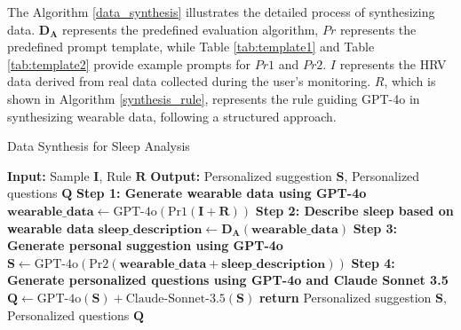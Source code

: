 \documentclass[preprint,12pt]{elsarticle}
\begin{document}
The Algorithm \ref{data_synthesis} illustrates the detailed process of synthesizing data. $\mathbf{D_A}$ represents the predefined evaluation algorithm, \(Pr\) represents the predefined prompt template, while Table \ref{tab:template1} and Table \ref{tab:template2} provide example prompts for \(Pr1\) and \(Pr2\).  \(I\) represents the HRV data derived from real data collected during the user’s monitoring. \(R\), which is shown in Algorithm \ref{synthesis_rule}, represents the rule guiding GPT-4o in synthesizing wearable data, following a structured approach.
\begin{algorithm}[h]
\caption{Data Synthesis for Sleep Analysis}\label{data_synthesis}
\begin{algorithmic}
\STATE \hspace{0.0cm} \textbf{Input:} Sample $\mathbf{I}$, Rule $\mathbf{R}$
\STATE \hspace{0.0cm} \textbf{Output:} Personalized suggestion $\mathbf{S}$, Personalized questions $\mathbf{Q}$
\STATE \hspace{0.0cm} \textbf{Step 1: Generate wearable data using GPT-4o}
\STATE \hspace{0.1cm} $\mathbf{wearable\_data} \gets \mathrm{GPT\text{-}4o}(\mathrm{Pr1}(\mathbf{I} + \mathbf{R}))$
\STATE \hspace{0.0cm} \textbf{Step 2: Describe sleep based on wearable data}
\STATE \hspace{0.1cm} $\mathbf{sleep\_description} \gets \mathbf{D_A}(\mathbf{wearable\_data})$
\STATE \hspace{0.0cm} \textbf{Step 3: Generate personal suggestion using GPT-4o}
\STATE \hspace{0.1cm} $\mathbf{S} \gets \mathrm{GPT\text{-}4o}(\mathrm{Pr2}(\mathbf{wearable\_data} + \mathbf{sleep\_description}))$
\STATE \hspace{0.0cm} \textbf{Step 4: Generate personalized questions using GPT-4o and Claude Sonnet 3.5}
\STATE \hspace{0.1cm} $\mathbf{Q} \gets \mathrm{GPT\text{-}4o}(\mathbf{S}) + \mathrm{Claude\text{-}Sonnet\text{-}3.5}(\mathbf{S})$
\STATE \hspace{0.1cm} \textbf{return} Personalized suggestion $\mathbf{S}$, Personalized questions $\mathbf{Q}$
\end{algorithmic}
\end{algorithm}
\end{document}
